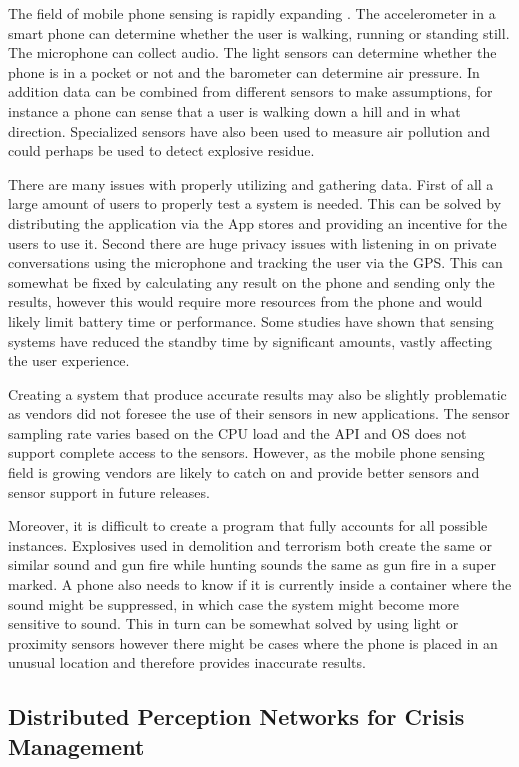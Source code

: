 The field of mobile phone sensing is rapidly expanding \cite{mobsurv}. The accelerometer in a smart phone can determine whether the user is walking, running or standing still. The microphone can collect audio. The light sensors can determine whether the phone is in a pocket or not and the barometer can determine air pressure. In addition data can be combined from different sensors to make assumptions, for instance a phone can sense that a user is walking down a hill and in what direction. Specialized sensors have also been used to measure air pollution and could perhaps be used to detect explosive residue.

There are many issues with properly utilizing and gathering data. First of all a large amount of users to properly test a system is needed. This can be solved by distributing the application via the App stores and providing an incentive for the users to use it. Second there are huge privacy issues with listening in on private conversations using the microphone and tracking the user via the GPS. This can somewhat be fixed by calculating any result on the phone and sending only the results, however this would require more resources from the phone and would likely limit battery time or performance. Some studies have shown that sensing systems have reduced the standby time by significant amounts, vastly affecting the user experience.

Creating a system that produce accurate results may also be slightly problematic as vendors did not foresee the use of their sensors in new applications. The sensor sampling rate varies based on the CPU load and the API and OS does not support complete access to the sensors. However, as the mobile phone sensing field is growing vendors are likely to catch on and provide better sensors and sensor support in future releases.

Moreover, it is difficult to create a program that fully accounts for all possible instances. Explosives used in demolition and terrorism both create the same or similar sound and gun fire while hunting sounds the same as gun fire in a super marked. A phone also needs to know if it is currently inside a container where the sound might be suppressed, in which case the system might become more sensitive to sound. This in turn can be somewhat solved by using light or proximity sensors however there might be cases where the phone is placed in an unusual location and therefore provides inaccurate results.

\subsection{Distributed Perception Networks for Crisis Management}

